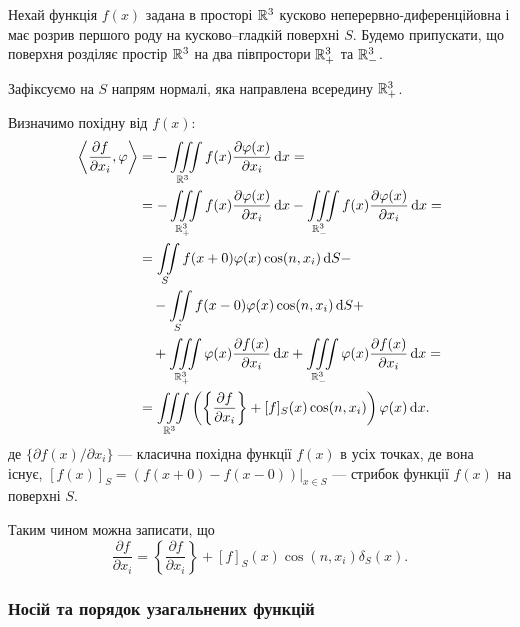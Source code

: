 \begin{example}
	Нехай функція $f(x)$ задана в просторі $\mathbb{R}^3$ кусково неперервно-ди\-фе\-рен\-ці\-йов\-на і має розрив першого роду на кусково–гладкій поверхні $S$. Будемо припускати, що поверхня   розділяє простір $\mathbb{R}^3$ на два півпростори $\mathbb{R}_+^3$ та $\mathbb{R}_-^3$.
\end{example}

\begin{solution}
	Зафіксуємо на $S$ напрям нормалі, яка направлена всередину $\mathbb{R}_+^3$. \medskip

	Визначимо похідну від $f(x)$:
	\begin{equation}
		\begin{aligned}
			\left\langle \frac{\partial f}{\partial x_i}, \phi \right\rangle &= - \Iiint_{\RR^3} f(x) \frac{\partial \phi(x)}{\partial x_i} \diff x = \\
			&= - \Iiint_{\RR_+^3} f(x) \frac{\partial \phi(x)}{\partial x_i} \diff x - \Iiint_{\RR_-^3} f(x) \frac{\partial \phi(x)}{\partial x_i} \diff x = \\
			&= \Iint_S f(x + 0) \phi(x) \cos(n, x_i) \diff S - \\
			&\quad- \Iint_S f(x - 0) \phi(x) \cos(n, x_i) \diff S + \\
			&\quad + \Iiint_{\RR_+^3} \phi(x) \frac{\partial f(x)}{\partial x_i} \diff x + \Iiint_{\RR_-^3} \phi(x) \frac{\partial f(x)}{\partial x_i} \diff x = \\
			&= \Iiint_{\RR^3} \left(  \left\{ \frac{\partial f}{\partial x_i}\right\} + [f]_S(x) \cos(n, x_i) \right) \phi(x) \diff x.
		\end{aligned}	
	\end{equation}
	де $\{\partial f(x) / \partial x_i\}$ --- класична похідна функції $f(x)$ в усіх точках, де вона існує, $[f(x)]_S = \left.(f(x + 0) - f(x - 0))\right|_{x \in S}$ --- стрибок функції $f(x)$ на поверхні $S$. \medskip

	Таким чином можна записати, що 
	\begin{equation}
		\frac{\partial f}{\partial x_i} = \left\{ \frac{\partial f}{\partial x_i}\right\} + [f]_S(x) \cos(n, x_i) \delta_S(x).
	\end{equation}
\end{solution}

\subsubsection{Носій та порядок узагальнених функцій}

